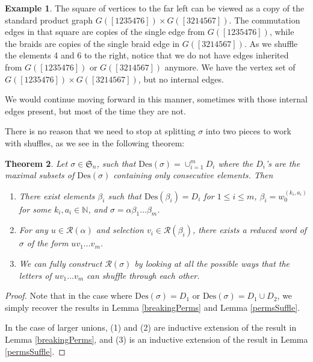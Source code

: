 \documentclass[11pt,reqno]{amsart}
\newtheorem{theorem}{Theorem}[section]
\theoremstyle{definition}
\newtheorem{example}[theorem]{Example}
\theoremstyle{notation}
\newcommand{\Des}{\text{Des}}
\newcommand{\calR}{\mathcal{R}}
\newcommand{\Sym}{\mathfrak{S}}
\newcommand{\N}{\mathbb{N}}
\begin{document}
\begin{example}
The square of vertices to the far left can be viewed as a copy of the standard product graph $G([1235476]) \times G([3214567])$. The commutation edges in that square are copies of the single edge from $G([1235476])$, while the braids are copies of the single braid edge in $G([3214567])$. As we shuffle the elements 4 and 6 to the right, notice that we do not have edges inherited from $G([1235476])$ or $G([3214567])$ anymore. We have the vertex set of $G([1235476]) \times G([3214567])$, but no internal edges.

We would continue moving forward in this manner, sometimes with those internal edges present, but most of the time they are not.
\end{example}

There is no reason that we need to stop at splitting $\sigma$ into two pieces to work with shuffles, as we see in the following theorem:

\begin{theorem}\label{thm:spliting_perms}
    Let $\sigma \in \Sym_n$, such that $\Des(\sigma) = \cup_{i=1}^m D_i$ where the $D_i$'s are the maximal subsets of $\Des(\sigma)$ containing only consecutive elements. Then
    \begin{enumerate}
        \item There exist elements $\beta_i$ such that $\Des(\beta_i) = D_i$ for $1\leq i \leq m$, $\beta_i = w_0^{(k_i,a_i)}$ for some $k_i,a_i\in\N $, and $\sigma = \alpha \beta_1 \ldots \beta_m$.
        \item For any $u\in \calR(\alpha)$ and selection $v_i\in \calR(\beta_i)$, there exists a reduced word of $\sigma$ of the form $uv_1\ldots v_m$. 
        \item We can fully construct $\calR(\sigma)$ by looking at all the possible ways that the letters of $uv_1\ldots v_m$ can shuffle through each other.
    \end{enumerate}
\end{theorem}

\begin{proof}
Note that in the case where $\Des(\sigma) = D_1$ or $\Des(\sigma)= D_1\cup D_2$, we simply recover the results in Lemma \ref{breakingPerms} and  Lemma \ref{permsSuffle}. 

In the case of larger unions, (1) and (2) are inductive extension of the result in Lemma \ref{breakingPerms}, and (3) is an inductive extension of the result in Lemma \ref{permsSuffle}.
\end{proof}
\end{document}
